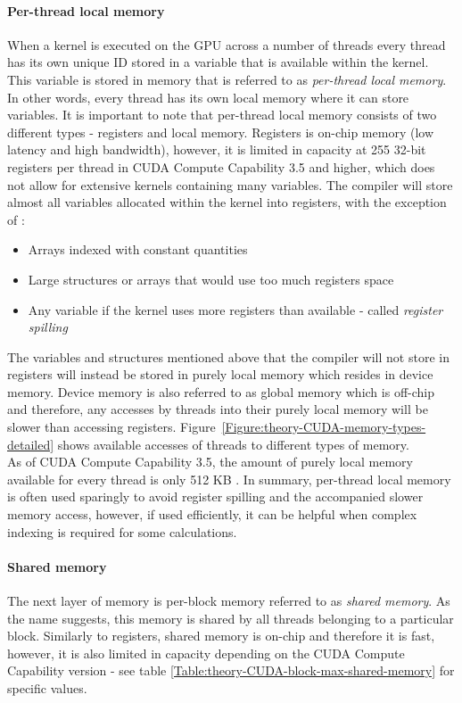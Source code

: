 \paragraph{Per-thread local memory}
When a kernel is executed on the GPU across a number of threads every thread has its own unique ID stored in a variable that is available within the kernel. This variable is stored in memory that is referred to as \textit{per-thread local memory}. In other words, every thread has its own local memory where it can store variables. It is important to note that per-thread local memory consists of two different types - registers and local memory. Registers is on-chip memory (low latency and high bandwidth), however, it is limited in capacity at 255 32-bit registers per thread in CUDA Compute Capability 3.5 and higher, which does not allow for extensive kernels containing many variables. The compiler will store almost all variables allocated within the kernel into registers, with the exception of \cite{NVIDIAMay2022}:
\begin{itemize}
	\item Arrays indexed with constant quantities
	\item Large structures or arrays that would use too much registers space
	\item Any variable if the kernel uses more registers than available - called \textit{register spilling}
\end{itemize}
The variables and structures mentioned above that the compiler will not store in registers will instead be stored in purely local memory which resides in device memory. Device memory is also referred to as global memory which is off-chip and therefore, any accesses by threads into their purely local memory will be slower than accessing registers. Figure~\ref{Figure:theory-CUDA-memory-types-detailed} shows available accesses of threads to different types of memory. \\
As of CUDA Compute Capability 3.5, the amount of purely local memory available for every thread is only 512 KB \cite{NVIDIAMay2022}. In summary, per-thread local memory is often used sparingly to avoid register spilling and the accompanied slower memory access, however, if used efficiently, it can be helpful when complex indexing is required for some calculations.

\paragraph{Shared memory}\label{Paragraph:theory-CUDA-memory-management-shared-memory}
The next layer of memory is per-block memory referred to as \textit{shared memory}. As the name suggests, this memory is shared by all threads belonging to a particular block. Similarly to registers, shared memory is on-chip and therefore it is fast, however, it is also limited in capacity depending on the CUDA Compute Capability version - see table \ref{Table:theory-CUDA-block-max-shared-memory} for specific values.

